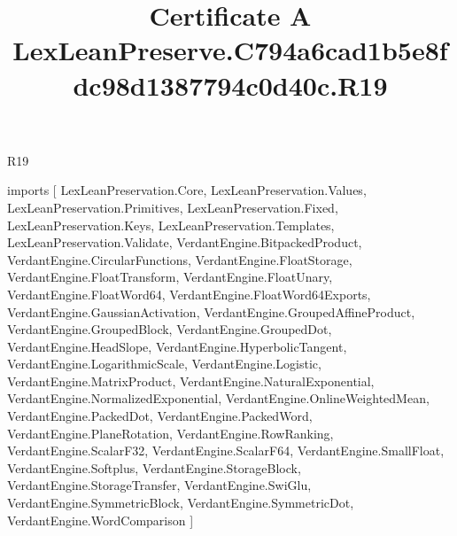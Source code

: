 \begin{lexlean}{R19}
\title{Certificate A LexLeanPreserve.C794a6cad1b5e8fdc98d1387794c0d40c.R19}
\begin{coremodule}
imports [
  LexLeanPreservation.Core,
  LexLeanPreservation.Values,
  LexLeanPreservation.Primitives,
  LexLeanPreservation.Fixed,
  LexLeanPreservation.Keys,
  LexLeanPreservation.Templates,
  LexLeanPreservation.Validate,
  VerdantEngine.BitpackedProduct,
  VerdantEngine.CircularFunctions,
  VerdantEngine.FloatStorage,
  VerdantEngine.FloatTransform,
  VerdantEngine.FloatUnary,
  VerdantEngine.FloatWord64,
  VerdantEngine.FloatWord64Exports,
  VerdantEngine.GaussianActivation,
  VerdantEngine.GroupedAffineProduct,
  VerdantEngine.GroupedBlock,
  VerdantEngine.GroupedDot,
  VerdantEngine.HeadSlope,
  VerdantEngine.HyperbolicTangent,
  VerdantEngine.LogarithmicScale,
  VerdantEngine.Logistic,
  VerdantEngine.MatrixProduct,
  VerdantEngine.NaturalExponential,
  VerdantEngine.NormalizedExponential,
  VerdantEngine.OnlineWeightedMean,
  VerdantEngine.PackedDot,
  VerdantEngine.PackedWord,
  VerdantEngine.PlaneRotation,
  VerdantEngine.RowRanking,
  VerdantEngine.ScalarF32,
  VerdantEngine.ScalarF64,
  VerdantEngine.SmallFloat,
  VerdantEngine.Softplus,
  VerdantEngine.StorageBlock,
  VerdantEngine.StorageTransfer,
  VerdantEngine.SwiGlu,
  VerdantEngine.SymmetricBlock,
  VerdantEngine.SymmetricDot,
  VerdantEngine.WordComparison
]


\end{coremodule}
\end{lexlean}
